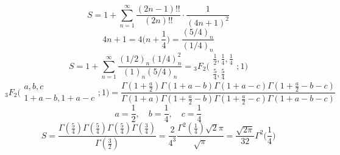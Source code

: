 


	$$S = 1+\sum_{n= 1}^{\infty} \frac{(2n-1)!!}{(2n)!!} \cdot \frac{1}{(4n+1)^2}$$
	$$4n+1 = 4\Big(n+\frac{1}{4}\Big) = \frac{(5/4)_n}{(1/4)_n}$$
	$$S = 1+\sum_{n= 1}^{\infty} \frac{(1/2)_n (1/4)_n^2}{(1)_n (5/4)_n} = {}_3F_2 \Big(\begin{array}{c}
		\frac{1}{2}, \frac{1}{4},\frac{1}{4}  \\ \frac{5}{4}, \frac{5}{4}
	\end{array}; 1\Big)$$
	$${}_3F_2 \Big(\begin{array}{c}
		a, b, c  \\ 1+a-b, 1+a-c
	\end{array}; 1\Big) = \frac{\Gamma(1+\frac{a}{2}) \Gamma(1+a-b) \Gamma(1+a-c) \Gamma(1+\frac{a}{2}-b-c)}{\Gamma(1+a) \Gamma(1+\frac{a}{2}-b) \Gamma(1+\frac{a}{2}-c) \Gamma(1+a-b-c)}$$
	$$a = \frac{1}{2}, \quad  b = \frac{1}{4}, \quad c = \frac{1}{4}$$
	$$S = \frac{\Gamma(\frac{5}{4}) \Gamma(\frac{5}{4}) \Gamma(\frac{5}{4}) \Gamma(\frac{3}{4})}{\Gamma(\frac{3}{2}) } = \frac{2}{4^3} \frac{ \Gamma^2(\frac{1}{4})\sqrt{2} \pi}{\sqrt{\pi}} = \frac{\sqrt{2\pi}}{32} \Gamma^2\Big(\frac{1}{4}\Big)$$
	
	
